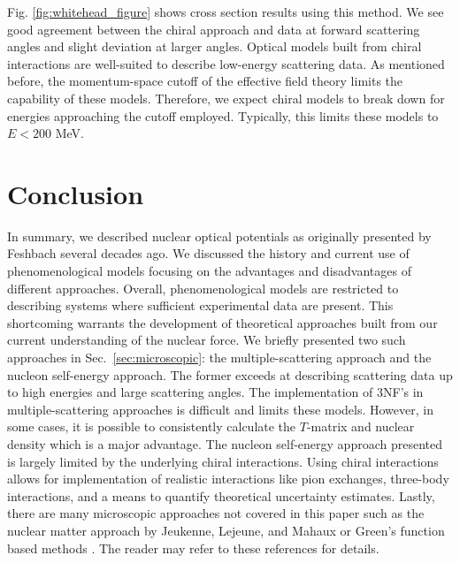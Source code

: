 \documentclass[preprintnumbers,floatfix,aps,prc,preprint,nofootinbib]{revtex4-1}
\begin{document}
Fig. \ref{fig:whitehead_figure} shows cross section results using this method. We see good agreement between the chiral approach and data at forward scattering angles and slight deviation at larger angles. Optical models built from chiral interactions are well-suited to describe low-energy scattering data. As mentioned before, the momentum-space cutoff of the effective field theory limits the capability of these models. Therefore, we expect chiral models to break down for energies approaching the cutoff employed. Typically, this limits these models to $E < 200$ MeV.


\section{Conclusion}
\label{sec:conclusion}


In summary, we described nuclear optical potentials as originally presented by Feshbach several decades ago. We discussed the history and current use of phenomenological models focusing on the advantages and disadvantages of different approaches. Overall, phenomenological models are restricted to describing systems where sufficient experimental data are present. This shortcoming warrants the development of theoretical approaches built from our current understanding of the nuclear force. We briefly presented two such approaches in Sec.~\ref{sec:microscopic}: the multiple-scattering approach and the nucleon self-energy approach. The former exceeds at describing scattering data up to high energies and large scattering angles. The implementation of 3NF's in multiple-scattering approaches is difficult and limits these models. However, in some cases, it is possible to consistently calculate the $T$-matrix and nuclear density which is a major advantage. The nucleon self-energy approach presented is largely limited by the underlying chiral interactions. Using chiral interactions allows for implementation of realistic interactions like pion exchanges, three-body interactions, and a means to quantify theoretical uncertainty estimates. Lastly, there are many microscopic approaches not covered in this paper such as the nuclear matter approach by Jeukenne, Lejeune, and Mahaux \cite{Jeukenne:1977zz} or Green's function based methods \cite{Dickhoff:2018wdd}. The reader may refer to these references for details.
\\
\end{document}
